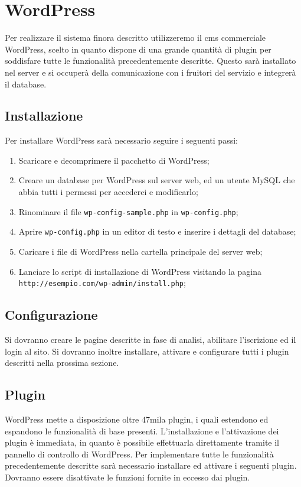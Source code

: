 \section{WordPress} \label{cms:wp}
Per realizzare il sistema finora descritto utilizzeremo il \gls{cms} commerciale WordPress, scelto in quanto dispone di una grande quantità di plugin per soddisfare tutte le funzionalità precedentemente descritte. Questo sarà installato nel server e si occuperà della comunicazione con i fruitori del servizio e integrerà il database.

\subsection{Installazione}
Per installare WordPress sarà necessario seguire i seguenti passi:
\begin{enumerate}
	\item Scaricare e decomprimere il pacchetto di WordPress;
	\item Creare un database per WordPress sul server web, ed un utente MySQL che abbia tutti i permessi per accederci e modificarlo;
	\item Rinominare il file \texttt{wp-config-sample.php} in \texttt{wp-config.php};
	\item Aprire \texttt{wp-config.php} in un editor di testo e inserire i dettagli del database;
	\item Caricare i file di WordPress nella cartella principale del server web;
	\item Lanciare lo script di installazione di WordPress visitando la pagina \texttt{http://esempio.com/wp-admin/install.php};
\end{enumerate}

\subsection{Configurazione}
Si dovranno creare le pagine descritte in fase di analisi, abilitare l'iscrizione ed il login al sito. Si dovranno inoltre installare, attivare e configurare tutti i plugin descritti nella prossima sezione.

\subsection{Plugin} \label{sec_plugin}
WordPress mette a disposizione oltre 47mila plugin, i quali estendono ed espandono le funzionalità di base presenti.
L'installazione e l'attivazione dei plugin è immediata, in quanto è possibile effettuarla direttamente tramite il pannello di controllo di WordPress.
Per implementare tutte le funzionalità precedentemente descritte sarà necessario installare ed attivare i seguenti plugin. Dovranno essere disattivate le funzioni fornite in eccesso dai plugin.

